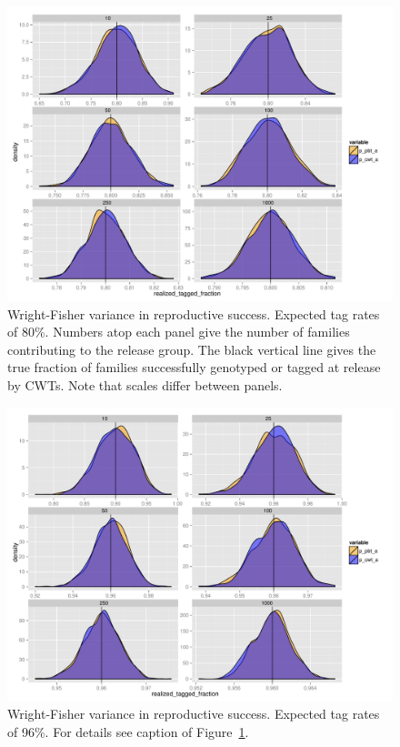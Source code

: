 \documentclass[11pt]{article}
\begin{document}
\begin{figure}
\includegraphics[width = \textwidth]{images/tag_fracts_80_WrightFisher.pdf}
\caption{Wright-Fisher variance in reproductive success. Expected tag rates of 80\%. Numbers
atop each panel give the number of families contributing to the release group. The black vertical line
gives the true fraction of families successfully genotyped or tagged at release by CWTs. Note that
scales differ between panels.}
\label{fig:wf80}
\end{figure}


\begin{figure}
\includegraphics[width = \textwidth]{images/tag_fracts_96_WrightFisher.pdf}
\caption{Wright-Fisher variance in reproductive success. Expected tag rates of 96\%. For details
see caption of Figure~\protect\ref{fig:wf80}.}
\label{fig:wf96}
\end{figure}
\end{document}

